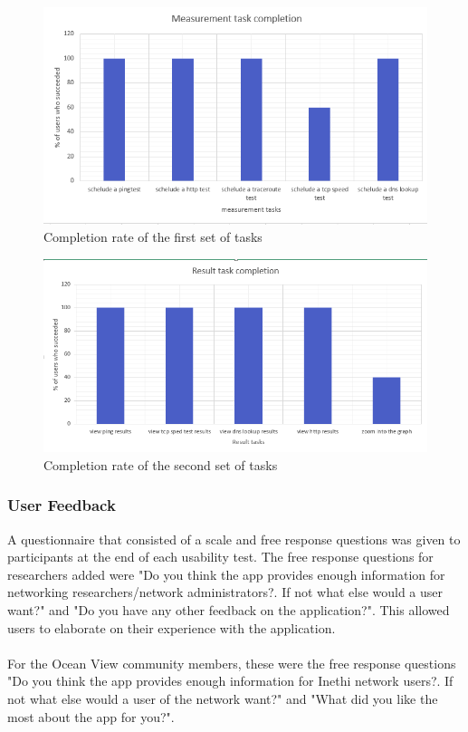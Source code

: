 \begin{figure}
	\centering
	\includegraphics[width=1\linewidth]{images/task1}
	\caption{Completion rate of the first set of tasks}
	\label{fig:proto}
\end{figure}

\begin{figure}
	\centering
	\includegraphics[width=1\linewidth]{images/task2}
	\caption{Completion rate of the second set of tasks}
	\label{fig:proto}
\end{figure}
\subsubsection{User Feedback}
A questionnaire that consisted of a scale and free response questions was given to participants  at the end of each usability test. The free response questions for researchers added were "Do you think the app provides enough information for networking researchers/network administrators?. If not what else would a user want?" and "Do you have any other feedback on the application?". This allowed users to elaborate on their experience with the application.
\paragraph{}
For the Ocean View community members, these were the free response questions "Do you think the app provides enough information for Inethi network users?. If not what else would a user of the network want?" and "What did you like the most about the app for you?".
